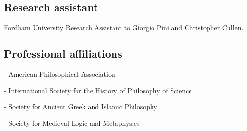 \subsection{Research assistant}
{Fordham University}
{Research Assistant to Giorgio Pini and Christopher Cullen.}
{}
\subsection{Professional affiliations}
- American Philosophical Association

- International Society for the History of Philosophy of Science
	
- Society for Ancient Greek and Islamic Philosophy

- Society for Medieval Logic and Metaphysics	

